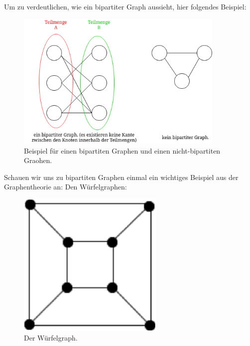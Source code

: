 \documentclass{article}
\theoremstyle{plain}
\begin{document}
\newpage
Um zu verdeutlichen, wie ein bipartiter Graph aussieht, hier folgendes Beispiel:
\begin{figure}[!htp]
    \centering
    \includegraphics[width=10cm]{vortrag_schriftlich/images/bipartit.drawio.png}
    \caption{Beispiel für einen bipartiten Graphen und einen nicht-bipartiten Graohen.}
    \label{fig:fig4}
\end{figure}
\clearpage
Schauen wir uns zu bipartiten Graphen einmal ein wichtiges Beispiel aus der Graphentheorie an: Den Würfelgraphen:\\
\begin{figure}[!htp]
    \centering
    \includegraphics[width=7cm]{vortrag_schriftlich/images/wuerfelgraph.png}
    \caption{Der Würfelgraph.}
    \label{fig:fig5}
\end{figure}
\newpage
\end{document}
